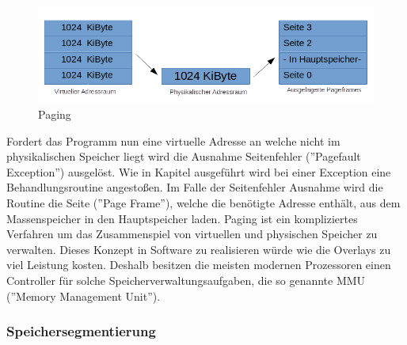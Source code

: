 \documentclass[12pt]{article}
\begin{document}
\begin{figure}[!htb]
\includegraphics[scale=0.7]{Paging}
\caption{Paging}
\centering
\label{fig:register}
\end{figure}



Fordert das Programm nun eine virtuelle Adresse an welche nicht im physikalischen Speicher liegt wird die Ausnahme Seitenfehler (''Pagefault Exception'') ausgelöst. Wie in Kapitel  ausgeführt wird bei einer Exception eine Behandlungsroutine angestoßen. Im Falle der Seitenfehler Ausnahme wird die Routine die Seite (''Page Frame''), welche die benötigte Adresse enthält, aus dem Massenspeicher in den Hauptspeicher laden. Paging ist ein kompliziertes Verfahren um das Zusammenspiel von virtuellen und physischen Speicher zu verwalten. Dieses Konzept in Software zu realisieren würde wie die Overlays zu viel Leistung kosten. Deshalb besitzen die meisten modernen Prozessoren einen Controller für solche Speicherverwaltungsaufgaben, die so genannte MMU (''Memory Management Unit''). 
\subsubsection{Speichersegmentierung}
\end{document}
